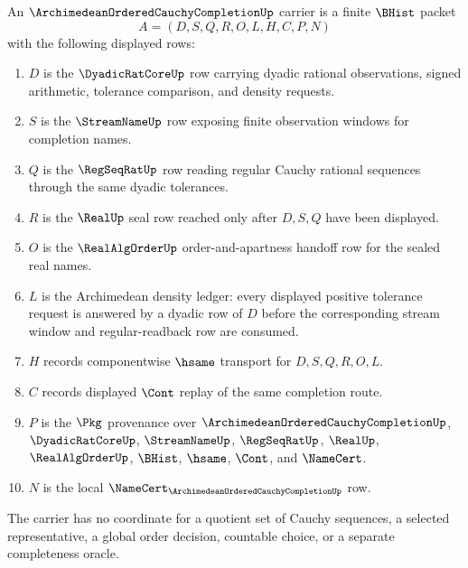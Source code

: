 \begin{definition}
\label{def:archimedean-ordered-cauchy-completion-carrier}
An $\ArchimedeanOrderedCauchyCompletionUp$ carrier is a finite $\BHist$ packet
$$
A=(D,S,Q,R,O,L,H,C,P,N)
$$
with the following displayed rows:
\begin{enumerate}
\item $D$ is the $\DyadicRatCoreUp$ row carrying dyadic rational observations, signed arithmetic, tolerance comparison, and density requests.
\item $S$ is the $\StreamNameUp$ row exposing finite observation windows for completion names.
\item $Q$ is the $\RegSeqRatUp$ row reading regular Cauchy rational sequences through the same dyadic tolerances.
\item $R$ is the $\RealUp$ seal row reached only after $D,S,Q$ have been displayed.
\item $O$ is the $\RealAlgOrderUp$ order-and-apartness handoff row for the sealed real names.
\item $L$ is the Archimedean density ledger: every displayed positive tolerance request is answered by a dyadic row of $D$ before the corresponding stream window and regular-readback row are consumed.
\item $H$ records componentwise $\hsame$ transport for $D,S,Q,R,O,L$.
\item $C$ records displayed $\Cont$ replay of the same completion route.
\item $P$ is the $\Pkg$ provenance over $\ArchimedeanOrderedCauchyCompletionUp$, $\DyadicRatCoreUp$, $\StreamNameUp$, $\RegSeqRatUp$, $\RealUp$, $\RealAlgOrderUp$, $\BHist$, $\hsame$, $\Cont$, and $\NameCert$.
\item $N$ is the local $\NameCert_{\ArchimedeanOrderedCauchyCompletionUp}$ row.
\end{enumerate}
The carrier has no coordinate for a quotient set of Cauchy sequences, a selected representative, a global order decision, countable choice, or a separate completeness oracle.
\end{definition}

